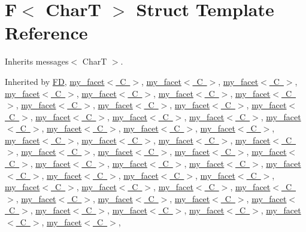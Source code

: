 \hypertarget{struct_f}{}\section{F$<$ CharT $>$ Struct Template Reference}
\label{struct_f}


Inherits messages$<$ Char\+T $>$.



Inherited by \mbox{\hyperlink{struct_f_d}{FD}}, \mbox{\hyperlink{structmy__facet}{my\+\_\+facet$<$ C $>$}}, \mbox{\hyperlink{structmy__facet}{my\+\_\+facet$<$ C $>$}}, \mbox{\hyperlink{structmy__facet}{my\+\_\+facet$<$ C $>$}}, \mbox{\hyperlink{structmy__facet}{my\+\_\+facet$<$ C $>$}}, \mbox{\hyperlink{structmy__facet}{my\+\_\+facet$<$ C $>$}}, \mbox{\hyperlink{structmy__facet}{my\+\_\+facet$<$ C $>$}}, \mbox{\hyperlink{structmy__facet}{my\+\_\+facet$<$ C $>$}}, \mbox{\hyperlink{structmy__facet}{my\+\_\+facet$<$ C $>$}}, \mbox{\hyperlink{structmy__facet}{my\+\_\+facet$<$ C $>$}}, \mbox{\hyperlink{structmy__facet}{my\+\_\+facet$<$ C $>$}}, \mbox{\hyperlink{structmy__facet}{my\+\_\+facet$<$ C $>$}}, \mbox{\hyperlink{structmy__facet}{my\+\_\+facet$<$ C $>$}}, \mbox{\hyperlink{structmy__facet}{my\+\_\+facet$<$ C $>$}}, \mbox{\hyperlink{structmy__facet}{my\+\_\+facet$<$ C $>$}}, \mbox{\hyperlink{structmy__facet}{my\+\_\+facet$<$ C $>$}}, \mbox{\hyperlink{structmy__facet}{my\+\_\+facet$<$ C $>$}}, \mbox{\hyperlink{structmy__facet}{my\+\_\+facet$<$ C $>$}}, \mbox{\hyperlink{structmy__facet}{my\+\_\+facet$<$ C $>$}}, \mbox{\hyperlink{structmy__facet}{my\+\_\+facet$<$ C $>$}}, \mbox{\hyperlink{structmy__facet}{my\+\_\+facet$<$ C $>$}}, \mbox{\hyperlink{structmy__facet}{my\+\_\+facet$<$ C $>$}}, \mbox{\hyperlink{structmy__facet}{my\+\_\+facet$<$ C $>$}}, \mbox{\hyperlink{structmy__facet}{my\+\_\+facet$<$ C $>$}}, \mbox{\hyperlink{structmy__facet}{my\+\_\+facet$<$ C $>$}}, \mbox{\hyperlink{structmy__facet}{my\+\_\+facet$<$ C $>$}}, \mbox{\hyperlink{structmy__facet}{my\+\_\+facet$<$ C $>$}}, \mbox{\hyperlink{structmy__facet}{my\+\_\+facet$<$ C $>$}}, \mbox{\hyperlink{structmy__facet}{my\+\_\+facet$<$ C $>$}}, \mbox{\hyperlink{structmy__facet}{my\+\_\+facet$<$ C $>$}}, \mbox{\hyperlink{structmy__facet}{my\+\_\+facet$<$ C $>$}}, \mbox{\hyperlink{structmy__facet}{my\+\_\+facet$<$ C $>$}}, \mbox{\hyperlink{structmy__facet}{my\+\_\+facet$<$ C $>$}}, \mbox{\hyperlink{structmy__facet}{my\+\_\+facet$<$ C $>$}}, \mbox{\hyperlink{structmy__facet}{my\+\_\+facet$<$ C $>$}}, \mbox{\hyperlink{structmy__facet}{my\+\_\+facet$<$ C $>$}}, \mbox{\hyperlink{structmy__facet}{my\+\_\+facet$<$ C $>$}}, \mbox{\hyperlink{structmy__facet}{my\+\_\+facet$<$ C $>$}}, \mbox{\hyperlink{structmy__facet}{my\+\_\+facet$<$ C $>$}}, \mbox{\hyperlink{structmy__facet}{my\+\_\+facet$<$ C $>$}}, \mbox{\hyperlink{structmy__facet}{my\+\_\+facet$<$ C $>$}}, \mbox{\hyperlink{structmy__facet}{my\+\_\+facet$<$ C $>$}}, \mbox{\hyperlink{structmy__facet}{my\+\_\+facet$<$ C $>$}}, \mbox{\hyperlink{structmy__facet}{my\+\_\+facet$<$ C $>$}}, \mbox{\hyperlink{structmy__facet}{my\+\_\+facet$<$ C $>$}}, \mbox{\hyperlink{structmy__facet}{my\+\_\+facet$<$ C $>$}}, \mbox{\hyperlink{structmy__facet}{my\+\_\+facet$<$ C $>$}}, 
